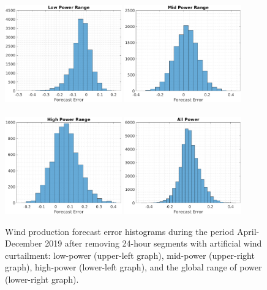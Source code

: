 \documentclass[11pt]{article}
\theoremstyle{definition}
\begin{document}
\begin{figure}[H]
\centering
\includegraphics[width=0.45\textwidth]{plots/LP.eps}
\includegraphics[width=0.45\textwidth]{plots/MP.eps}\\
\quad\\
\includegraphics[width=0.45\textwidth]{plots/HP.eps}
\includegraphics[width=0.45\textwidth]{plots/AP.eps}
\caption{Wind production forecast error histograms during the period April-December 2019 after removing 24-hour segments with artificial wind curtailment: low-power (upper-left graph), mid-power (upper-right graph), high-power (lower-left graph), and the global range of power (lower-right graph).}
  \label{fig:data_after_clean}
\end{figure}
\end{document}
